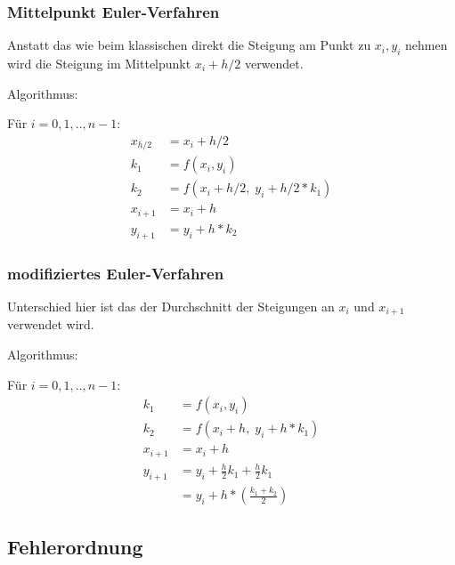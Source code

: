 \subsubsection{Mittelpunkt Euler-Verfahren}

Anstatt das wie beim klassischen direkt die Steigung am Punkt zu $x_i, y_i$ nehmen
wird die Steigung im Mittelpunkt $x_i + h/2$ verwendet.


\begingroup
\addtolength{\jot}{0.5em}
\large
Algorithmus:

Für $i = 0,1,..,n-1$:
\begin{align*}
	x_{h/2} & = x_i + h/2                        \\
	k_1     & = f(x_i, y_i)                      \\
	k_2     & = f(x_i + h/2, \; y_i + h/2 * k_1) \\
	x_{i+1} & = x_i + h                          \\
	y_{i+1} & = y_i + h * k_2
\end{align*}
\endgroup


\subsubsection{modifiziertes Euler-Verfahren}

Unterschied hier ist das der Durchschnitt der Steigungen an $x_i$ und $x_{i+1}$
verwendet wird.

\begingroup
\addtolength{\jot}{0.5em}
\large
Algorithmus:

Für $i = 0,1,..,n-1$:
\begin{align*}
	k_1     & = f(x_i, y_i)                                \\
	k_2     & = f(x_i + h, \; y_i + h * k_1)               \\
	x_{i+1} & = x_i + h                                    \\
	y_{i+1} & = y_i + \frac{h}{2} k_1 + \frac{h}{2} k_1    \\
	        & = y_i + h * \left(\frac{k_1 + k_2}{2}\right)
\end{align*}
\endgroup



\subsection{Fehlerordnung}


